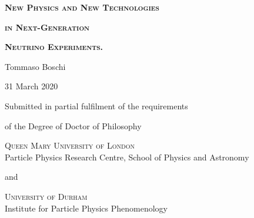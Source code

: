 
\begin{center}

	\vspace*{10em}

	\textsc{\Huge \bfseries New Physics and New Technologies}

	\bigskip
	\textsc{\Huge \bfseries in Next-Generation}

	\bigskip
	\textsc{\Huge \bfseries Neutrino Experiments.}

	\vfill
	{\huge Tommaso Boschi}

	\medskip
	{\Large 31 March 2020}

	\vfill
	{\large
	Submitted in partial fulfilment of the requirements

	of the Degree of Doctor of Philosophy}

	\vfill
	{\Large
	\textsc{Queen Mary University of London} \\
	Particle Physics Research Centre, School of Physics and Astronomy}

	\bigskip
	{\large and}

	\bigskip
	{\Large
	\textsc{University of Durham} \\ 
	Institute for Particle Physics Phenomenology}
	\vspace*{8em}

\end{center}

\restoregeometry
